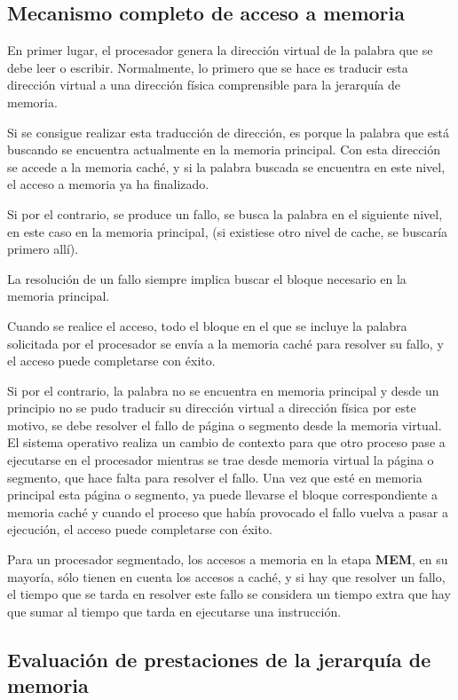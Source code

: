 \subsection{Mecanismo completo de acceso a memoria}

En primer lugar, el procesador genera la dirección virtual de la palabra que se debe leer o escribir. Normalmente, lo primero que se hace es traducir esta dirección virtual a una dirección física comprensible para la jerarquía de memoria.

Si se consigue realizar esta traducción de dirección, es porque la palabra que está buscando se encuentra actualmente en la memoria principal. Con esta dirección se accede a la memoria caché, y si la palabra buscada se encuentra en este nivel, el acceso a memoria ya ha finalizado.

Si por el contrario, se produce un fallo, se busca la palabra en el siguiente nivel, en este caso en la memoria principal, (si existiese otro nivel de cache, se buscaría primero allí).

La resolución de un fallo siempre implica buscar el bloque necesario en la memoria principal.

Cuando se realice el acceso, todo el bloque en el que se incluye la palabra solicitada por el procesador se envía a la memoria caché para resolver su fallo, y el acceso puede completarse con éxito.

Si por el contrario, la palabra no se encuentra en memoria principal y desde un principio no se pudo traducir su dirección virtual a dirección física por este motivo, se debe resolver el fallo de página o segmento desde la memoria virtual. El sistema operativo realiza un cambio de contexto para que otro proceso pase a ejecutarse en el procesador mientras se trae desde memoria virtual la página o segmento, que hace falta para resolver el fallo. Una vez que esté en memoria principal esta página o segmento, ya puede llevarse el bloque correspondiente a memoria caché y cuando el proceso que había provocado el fallo vuelva a pasar a ejecución, el acceso puede completarse con éxito.

Para un procesador segmentado, los accesos a memoria en la etapa \textbf{MEM}, en su mayoría, sólo tienen en cuenta los accesos a caché, y si hay que resolver un fallo, el tiempo que se tarda en resolver este fallo se considera un tiempo extra que hay que sumar al tiempo que tarda en ejecutarse una instrucción. 

\subsection{Evaluación de prestaciones de la jerarquía de memoria}

